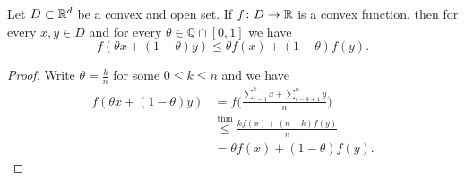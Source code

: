 \begin{cor}\label{cor:rational-convexity}
    Let\/ $D \subset \mathbb{R}^d$ be a convex and open set. If\/ $f\colon D \to \mathbb{R}$ is a convex function, then for every\/ $x, y \in D$ and for every\/ $\theta \in \mathbb{Q} \cap [0, 1]$ we have
    \[
        f(\theta x + (1 - \theta)y)
            \le \theta f(x) + (1 - \theta)f(y).
    \]
\end{cor}

\begin{proof}
    Write $\theta=\frac kn$ for some $0\le k\le n$ and we have
    \begin{align*}
        f(\theta x+(1-\theta)y)
            &= f\bigg(
                \frac{\sum_{i=1}^kx + \sum_{i=k+1}^ny}n
                \bigg)\\
            &\stackrel{\mathrm{thm}}\le
                \frac{kf(x)+(n-k)f(y)}n\\
            &= \theta f(x)+(1-\theta)f(y).
    \end{align*}
\end{proof}

